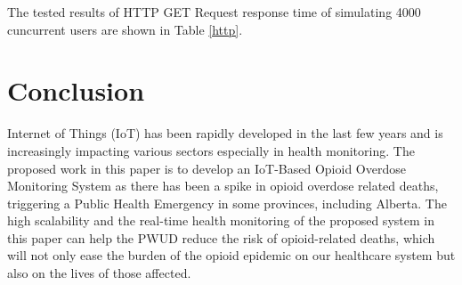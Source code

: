 \documentclass[conference]{IEEEtran}
\begin{document}
The tested results of HTTP GET Request response time of simulating 4000 cuncurrent users are shown in Table \ref{http}.


\section{Conclusion}

Internet of Things (IoT) has been rapidly developed in the last few years and is increasingly impacting various sectors especially in health monitoring. The proposed work in this paper is to develop an IoT-Based Opioid Overdose Monitoring System as there has been a spike in opioid overdose related deaths, triggering a Public Health Emergency in some provinces, including Alberta. The high scalability and the real-time health monitoring of the proposed system in this paper can help the PWUD reduce the risk of opioid-related deaths, which will not only ease the burden of the opioid epidemic on our healthcare system but also on the lives of those affected.




\newpage
\end{document}
